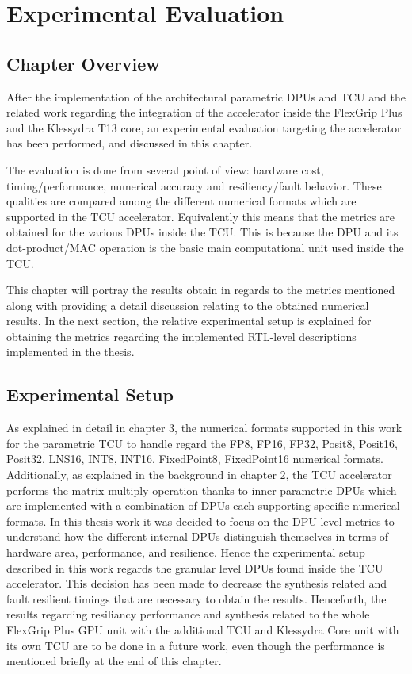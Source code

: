 \chapter{Experimental Evaluation}

\section{Chapter Overview}


After the implementation of the architectural parametric DPUs and TCU and the related work regarding the integration of the accelerator inside the FlexGrip Plus and the Klessydra T13 core, an experimental evaluation targeting the accelerator has been performed, and discussed in this chapter.

The evaluation is done from several point of view: hardware cost, timing/performance, numerical accuracy and resiliency/fault behavior. These qualities are compared among the different numerical formats which are supported in the TCU accelerator. Equivalently this means that the metrics are obtained for the various DPUs inside the TCU. This is because the DPU and its dot-product/MAC operation is the basic main computational unit used inside the TCU. 

This chapter will portray the results obtain in regards to the metrics mentioned along with providing a detail discussion relating to the obtained numerical results. In the next section, the relative experimental setup is explained for obtaining the metrics regarding the implemented RTL-level descriptions implemented in the thesis.

\section{Experimental Setup}


As explained in detail in chapter 3, the numerical formats supported in this work for the parametric TCU to handle regard the FP8, FP16, FP32, Posit8, Posit16, Posit32, LNS16, INT8, INT16, FixedPoint8, FixedPoint16 numerical formats. Additionally, as explained in the background in chapter 2, the TCU accelerator performs the matrix multiply operation thanks to inner parametric DPUs which are implemented with a combination of DPUs each supporting specific numerical formats. In this thesis work it was decided to focus on the DPU level metrics to understand how the different internal DPUs distinguish themselves in terms of hardware area, performance, and resilience. Hence the experimental setup described in this work regards the granular level DPUs found inside the TCU accelerator. This decision has been made to decrease the synthesis related and fault resilient timings that are necessary to obtain the results. Henceforth, the results regarding resiliancy performance and synthesis related to the whole FlexGrip Plus GPU unit with the additional TCU and Klessydra Core unit with its own TCU are to be done in a future work, even though the performance is mentioned briefly at the end of this chapter.

